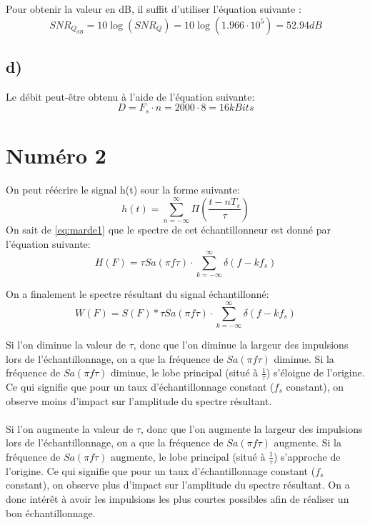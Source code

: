 Pour obtenir la valeur en dB, il suffit d'utiliser l'équation suivante :
\begin{equation}
	SNR_{Q_{dB}} = 10 \log(SNR_Q) = 10 \log(1.966 \cdot 10^5) = 52.94 dB
\end{equation}

\subsection*{d)}
Le débit peut-être obtenu à l'aide de l'équation suivante:
\begin{equation}
	D = F_s \cdot n = 2000 \cdot 8 = 16 kBits
\end{equation}

\section*{Numéro 2}
On peut réécrire le signal h(t) sour la forme suivante:
\begin{equation}
h(t) = \sum_{n = -\infty}^{\infty} \Pi\left(\frac{t - nT_s}{\tau}\right)
\label{eq:marde1}
\end{equation}
On sait de \ref{eq:marde1} que le spectre de cet échantillonneur est donné par l'équation suivante:
\begin{equation}
H(F) = \tau Sa(\pi f \tau)\cdot \sum_{k = -\infty}^{\infty} \delta(f - kf_s)
\end{equation}

On a finalement le spectre résultant du signal échantillonné:
\begin{equation}
W(F) = S(F) * \tau Sa(\pi f \tau)\cdot \sum_{k = -\infty}^{\infty} \delta(f - kf_s)
\end{equation}

Si l'on diminue la valeur de $\tau$, donc que l'on diminue la largeur des impulsions lors de l'échantillonnage, on a que la fréquence de $Sa(\pi f \tau)$ diminue. Si la fréquence de $Sa(\pi f \tau)$ diminue, le lobe principal (situé à $\frac{1}{\tau}$) s'éloigne de l'origine. Ce qui signifie que pour un taux d'échantillonnage constant ($f_s$ constant), on observe moins d'impact sur l'amplitude du spectre résultant.
\paragraph{}Si l'on augmente la valeur de $\tau$, donc que l'on augmente la largeur des impulsions lors de l'échantillonnage, on a que la fréquence de $Sa(\pi f \tau)$ augmente. Si la fréquence de $Sa(\pi f \tau)$ augmente, le lobe principal (situé à $\frac{1}{\tau}$) s'approche de l'origine. Ce qui signifie que pour un taux d'échantillonnage constant ($f_s$ constant), on observe plus d'impact sur l'amplitude du spectre résultant. On a donc intérêt à avoir les impulsions les plus courtes possibles afin de réaliser un bon échantillonnage.

